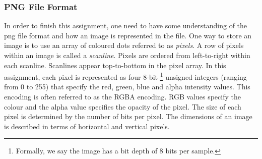 \subsubsection{PNG File Format}
\label{subsec_PNG_File_Format}
In order to finish this assignment, one need to have some understanding of the png file format and how an image is represented in the file. One way to store an image is to use an array of coloured dots referred to as {\em pixels}. A row of pixels within an image is called a {\em scanline}. Pixels are ordered from left-to-right within each scanline. Scanlines appear top-to-bottom in the pixel array. In this assignment, each pixel is represented as four 8-bit
\footnote{Formally, we say the image has a bit depth of 8 bits per sample.}
unsigned integers (ranging from 0 to 255) that specify the red, green, blue and alpha intensity values. This encoding is often referred to as the RGBA encoding. RGB values specify the colour and the alpha value specifies the opacity of the pixel. The size of each pixel is determined by the number of bits per pixel. The dimensions of an image is described in terms of horizontal and vertical pixels. 

\begin{figure}[h]  
\centering
{}
\end{figure}

